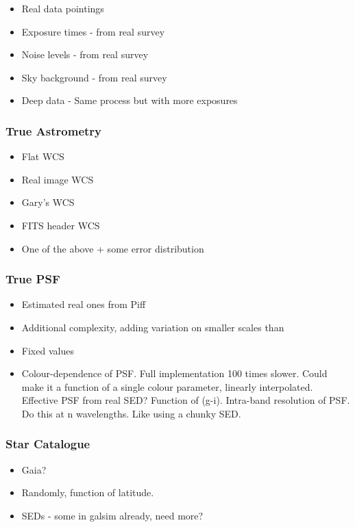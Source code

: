 \documentclass[\docopts]{\docclass}
\begin{document}
\begin{itemize}
\item Real data pointings
\item Exposure times - from real survey
\item Noise levels - from real survey
\item Sky background - from real survey
\item Deep data - Same process but with more exposures
\end{itemize}


\subsubsection{True Astrometry}

\begin{itemize}
\item Flat WCS
\item Real image WCS
\item Gary's WCS
\item FITS header WCS
\item One of the above + some error distribution
\end{itemize}

\subsubsection{True PSF}

\begin{itemize}
\item Estimated real ones from Piff
\item Additional complexity, adding variation on smaller scales than 
\item Fixed values
\item Colour-dependence of PSF.
	  Full implementation 100 times slower.
	  Could make it a function of a single colour parameter, linearly interpolated.
	  Effective PSF from real SED? Function of (g-i).
	  Intra-band resolution of PSF.  Do this at n wavelengths.
	  Like using a chunky SED.
\end{itemize}

\subsubsection{Star Catalogue}

\begin{itemize}
\item Gaia?
\item Randomly, function of latitude.
\item SEDs - some in galsim already, need more?
\end{itemize}
\end{document}
